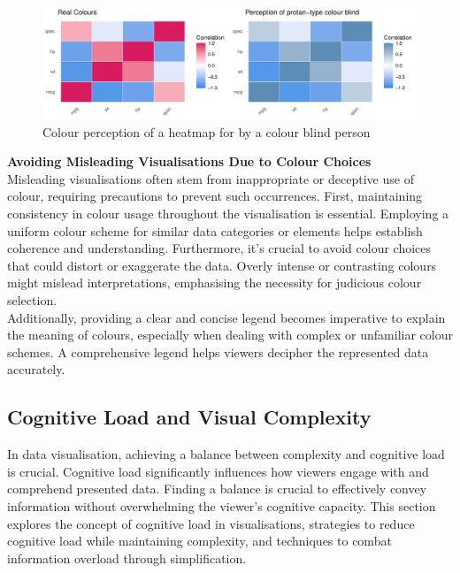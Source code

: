 \documentclass{article}\usepackage[]{graphicx}\usepackage[]{xcolor}
\makeatletter
\def\maxwidth{ %
  \ifdim\Gin@nat@width>\linewidth
    \linewidth
  \else
    \Gin@nat@width
  \fi
}
\newenvironment{knitrout}{}{} %
\makeatother
\begin{document}
\begin{knitrout}\scriptsize
{}\color{fgcolor}\begin{figure}[H]

{\centering \includegraphics[width=\maxwidth]{figure/beamer-colour-plot-1} 

}

\caption[Colour perception of a heatmap for by a colour blind person]{Colour perception of a heatmap for by a colour blind person}\label{fig:colour-plot}
\end{figure}

\end{knitrout}

\noindent \textbf{Avoiding Misleading Visualisations Due to Colour Choices}\\
Misleading visualisations often stem from inappropriate or deceptive use of colour, requiring precautions to prevent such occurrences. First, maintaining consistency in colour usage throughout the visualisation is essential. Employing a uniform colour scheme for similar data categories or elements helps establish coherence and understanding. Furthermore, it's crucial to avoid colour choices that could distort or exaggerate the data. Overly intense or contrasting colours might mislead interpretations, emphasising the necessity for judicious colour selection.\\
Additionally, providing a clear and concise legend becomes imperative to explain the meaning of colours, especially when dealing with complex or unfamiliar colour schemes. A comprehensive legend helps viewers decipher the represented data accurately.\\


\subsection{Cognitive Load and Visual Complexity}
In data visualisation, achieving a balance between complexity and cognitive load is crucial. Cognitive load significantly influences how viewers engage with and comprehend presented data. Finding a balance is crucial to effectively convey information without overwhelming the viewer's cognitive capacity. This section explores the concept of cognitive load in visualisations, strategies to reduce cognitive load while maintaining complexity, and techniques to combat information overload through simplification.\\
\end{document}

